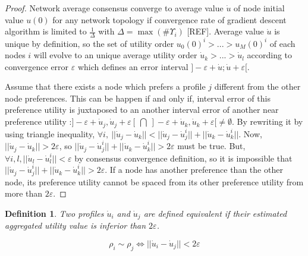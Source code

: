 \documentclass[conference]{IEEEtran}
\newtheorem{definition}{Definition}
\begin{document}
\begin{proof}
Network average consensus converge to average value $\dot{u}$ of node initial value $u(0)$ for any network topology if convergence rate of gradient descent algorithm is limited to $\frac{1}{\Delta}$ with $\Delta = \max(\#\Upsilon_i)$ [REF]. Average value $\dot{u}$ is unique by definition, so the set of utility order $u_0(0)^i > ... > u_M(0)^i$ of each nodes $i$ will evolve to an unique average utility order $\dot{u}_k > ... > \dot{u}_l$ according to convergence error $\varepsilon$ which defines an error interval $]- \varepsilon + \dot{u} ; \dot{u} + \varepsilon [$. 

Assume that there exists a node which prefers a profile $j$ different from the other node preferences. This can be happen if and only if, interval error of this preference utility is juxtaposed to an another interval error of another near preference utility :$]-\varepsilon + \dot{u}_j, \dot{u}_j + \varepsilon [ \ \bigcap \ ]-\varepsilon + \dot{u}_k, \dot{u}_k + \varepsilon [ \not = \emptyset $. By rewriting it by using triangle inequality, $ \forall i, \  ||\dot{u}_j - \dot{u}_k|| < ||\dot{u}_j - \dot{u}_j^i || + ||\dot{u}_k - \dot{u}_k^i||$. Now, $|| \dot{u}_j - \dot{u}_k|| > 2 \varepsilon$, so $||\dot{u}_j - \dot{u}_j^i || + ||\dot{u}_k - \dot{u}_k^i|| > 2 \varepsilon$ must be true. But, $\forall i,l, ||\dot{u}_l - \dot{u}_l^i|| < \varepsilon$ by consensus convergence definition, so it is impossible that $||\dot{u}_j - \dot{u}_j^i || + ||\dot{u}_k - \dot{u}_k^i|| > 2 \varepsilon$. If a node has another preference than the other node, its preference utility cannot be spaced from its other preference utility from more than $2 \varepsilon$.


\end{proof}

\begin{definition}
\label{def-equivalent}
Two profiles $\dot{u}_i$ and $\dot{u}_j$ are defined equivalent if their estimated aggregated utility value is inferior than $2 \varepsilon$.
\end{definition}
\begin{equation}
\label{eq-decision-equivalent}
\rho_i \sim \rho_j  \Longleftrightarrow ||\dot{u}_i - \dot{u}_j|| < 2 \varepsilon 
\end{equation}
\end{document}
